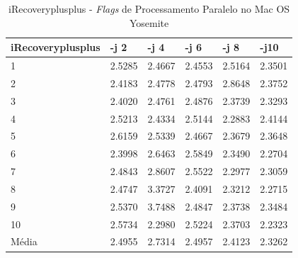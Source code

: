\begin{apendicesenv}
\begin{table}[!ht]
\centering
\tiny
\caption{iRecoveryplusplus - \textit{Flags} de Processamento Paralelo no Mac OS Yosemite}
\label{tab:flag_processamento_paralelo:mac:irecoveryplusplus}
\begin{tabular}{llllll}
\textbf{iRecoveryplusplus} & \textbf{-j 2} & \textbf{-j 4} & \textbf{-j 6} & \textbf{-j 8} & \textbf{-j10}  \\ \toprule
1                          & 2.5285        &  2.4667       &  2.4553       &  2.5164       &  2.3501    \\ 
2                          & 2.4183        &  2.4778       &  2.4793       &  2.8648       &  2.3752    \\ 
3                          & 2.4020        &  2.4761       &  2.4876       &  2.3739       &  2.3293    \\ 
4                          & 2.5213        &  2.4334       &  2.5144       &  2.2883       &  2.4144    \\ 
5                          & 2.6159        &  2.5339       &  2.4667       &  2.3679       &  2.3648    \\ 
6                          & 2.3998        &  2.6463       &  2.5849       &  2.3490       &  2.2704    \\ 
7                          & 2.4843        &  2.8607       &  2.5522       &  2.2977       &  2.3059    \\ 
8                          & 2.4747        &  3.3727       &  2.4091       &  2.3212       &  2.2715    \\ 
9                          & 2.5370        &  3.7488       &  2.4847       &  2.3738       &  2.3484    \\ 
10                         & 2.5734        &  2.2980       &  2.5224       &  2.3703       &  2.2323    \\ \bottomrule
Média                      & 2.4955        &  2.7314       &  2.4957       &  2.4123       &  2.3262    \\ 
\end{tabular}
\end{table}


\end{apendicesenv}
